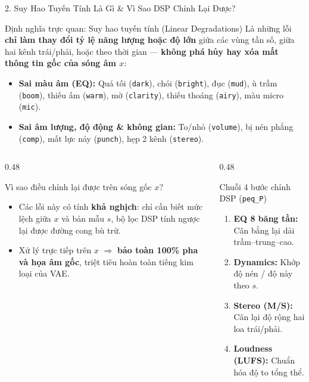 \documentclass[aspectratio=169,10pt]{beamer}
\begin{document}
\begin{frame}{2. Suy Hao Tuyến Tính Là Gì \& Vì Sao DSP Chỉnh Lại Được?}
  \footnotesize
  \begin{block}{Định nghĩa trực quan: Suy hao tuyến tính (Linear Degradations)}
    Là những lỗi \textbf{chỉ làm thay đổi tỷ lệ năng lượng hoặc độ lớn} giữa các vùng tần số, giữa hai kênh trái/phải, hoặc theo thời gian — \textbf{không phá hủy hay xóa mất thông tin gốc của sóng âm $x$}:
    \begin{itemize}
      \item \textbf{Sai màu âm (EQ):} Quá tối (\texttt{dark}), chói (\texttt{bright}), đục (\texttt{mud}), ù trầm (\texttt{boom}), thiếu ấm (\texttt{warm}), mờ (\texttt{clarity}), thiếu thoáng (\texttt{airy}), màu micro (\texttt{mic}).
      \item \textbf{Sai âm lượng, độ động \& không gian:} To/nhỏ (\texttt{volume}), bị nén phẳng (\texttt{comp}), mất lực nảy (\texttt{punch}), hẹp 2 kênh (\texttt{stereo}).
    \end{itemize}
  \end{block}
  \begin{columns}[T]
    \begin{column}{0.48\textwidth}
      \begin{exampleblock}{Vì sao điều chỉnh lại được trên sóng gốc $x$?}
        \begin{itemize}
          \item Các lỗi này có tính \textbf{khả nghịch}: chỉ cần biết mức lệch giữa $x$ và bản mẫu $s$, bộ lọc DSP tính ngược lại được đường cong bù trừ.
          \item Xử lý trực tiếp trên $x$ $\Rightarrow$ \textbf{bảo toàn 100\% pha và họa âm gốc}, triệt tiêu hoàn toàn tiếng kim loại của VAE.
        \end{itemize}
      \end{exampleblock}
    \end{column}
    \begin{column}{0.48\textwidth}
      \begin{block}{Chuỗi 4 bước chỉnh DSP (\texttt{peq\_P})}
        \begin{enumerate}
          \item \textbf{EQ 8 băng tần:} Cân bằng lại dải trầm--trung--cao.
          \item \textbf{Dynamics:} Khớp độ nén / độ nảy theo $s$.
          \item \textbf{Stereo (M/S):} Cân lại độ rộng hai loa trái/phải.
          \item \textbf{Loudness (LUFS):} Chuẩn hóa độ to tổng thể.
        \end{enumerate}
      \end{block}
    \end{column}
  \end{columns}
\end{frame}
\end{document}
